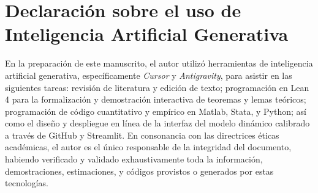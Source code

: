 \documentclass[review,authoryear,12pt]{elsarticle}
\theoremstyle{plain}
\theoremstyle{definition}
\newcommand{\1}{\mathbf{1}}
\begin{document}
\section*{Declaración sobre el uso de Inteligencia Artificial Generativa}

En la preparación de este manuscrito, el autor utilizó herramientas de inteligencia artificial generativa, específicamente \emph{Cursor} y \emph{Antigravity}, para asistir en las siguientes tareas: revisión de literatura y edición de texto; programación en Lean 4 para la formalización y demostración interactiva de teoremas y lemas teóricos; programación de código cuantitativo y empírico en Matlab, Stata, y Python; así como el diseño y despliegue en línea de la interfaz del modelo dinámico calibrado a través de GitHub y Streamlit. En consonancia con las directrices éticas académicas, el autor es el único responsable de la integridad del documento, habiendo verificado y validado exhaustivamente toda la información, demostraciones, estimaciones, y códigos provistos o generados por estas tecnologías.




\end{document}
